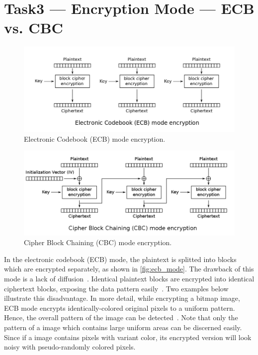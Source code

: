 \section{Task3 --- Encryption Mode --- ECB vs. CBC}
%

\begin{figure}
    \centering
    \includegraphics[height=\textheight,width=\textwidth,keepaspectratio]
    {figures/ECB_encryption.png}
    \caption{Electronic Codebook (ECB) mode encryption.}\label{fig:ecb_mode}
\end{figure}

\begin{figure}
    \centering
    \includegraphics[height=\textheight,width=\textwidth,keepaspectratio]
    {figures/CBC_encryption.png}
    \caption{Cipher Block Chaining (CBC) mode encryption.}\label{fig:cbc_mode}
\end{figure}

In the electronic codebook (ECB) mode, the plaintext is splitted into
blocks which are encrypted separately, as shown in \autoref{fig:ecb_mode}.
The drawback of this mode is a lack of diffusion~\cite{cipher_mode_wiki}.
Identical plaintext blocks are encrypted into identical ciphertext blocks,
exposing the data pattern easily~\cite{ecb_cbc_example}. Two examples below
illustrate this disadvantage. In more detail, while encrypting a bitmap
image, ECB mode encrypts identically-colored original pixels to a uniform
pattern. Hence, the overall pattern of the image can be detected~\cite{cipher_mode_wiki}.
Note that only the pattern of a image which contains large uniform areas
can be discerned easily. Since if a image contains pixels with variant 
color, its encrypted version will look noisy with pseudo-randomly colored
pixels.

